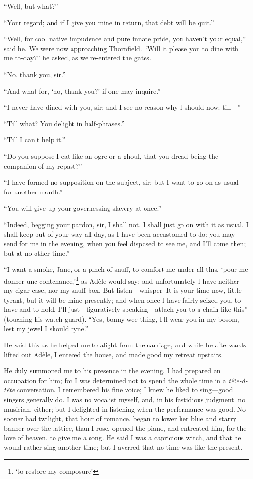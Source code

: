 \enquote{Well, but what?}

\enquote{Your regard; and if I give you mine in return, that debt will
	be quit.}

\enquote{Well, for cool native impudence and pure innate pride, you
	haven't your equal,} said he.  We were now approaching Thornfield.
\enquote{Will it please you to dine with me to-day?} he asked, as we
re-entered the gates.

\enquote{No, thank you, sir.}

\enquote{And what for, \enquote{no, thank you?} if one may inquire.}

\enquote{I never have dined with you, sir: and I see no reason why I
	should now: till---}

\enquote{Till what?  You delight in half-phrases.}

\enquote{Till I can't help it.}

\enquote{Do you suppose I eat like an ogre or a ghoul, that you dread
	being the companion of my repast?}

\enquote{I have formed no supposition on the subject, sir; but I want to
	go on as usual for another month.}

\enquote{You will give up your governessing slavery at once.}

\enquote{Indeed, begging your pardon, sir, I shall not.  I shall just go
	on with it as usual.  I shall keep out of your way all day, as I have
	been accustomed to do: you may send for me in the evening, when you feel
	disposed to see me, and I'll come then; but at no other time.}

\enquote{I want a smoke, Jane, or a pinch of snuff, to comfort me under
	all this, \foreignquote{french}{pour me donner une contenance,}\footnote{
		\enquote{to restore my composure}} as Adèle would say;
	and unfortunately I have neither my cigar-case, nor my snuff-box.  But
	listen---whisper.  It is your time now, little tyrant, but it will be
	mine presently; and when once I have fairly seized you, to have and to
	hold, I'll just---figuratively speaking---attach you to a chain like
	this} (touching his watch-guard).  \enquote{Yes, bonny wee thing, I'll
	wear you in my bosom, lest my jewel I should tyne.}

He said this as he helped me to alight from the carriage, and while he
afterwards lifted out Adèle, I entered the house, and made good my
retreat upstairs.

He duly summoned me to his presence in the evening.  I had prepared an
occupation for him; for I was determined not to spend the whole time in
a \foreignlanguage{french}{\emph{tête-à-tête}} conversation.  I remembered his fine voice; I knew
he liked to sing---good singers generally do.  I was no vocalist myself,
and, in his fastidious judgment, no musician, either; but I delighted in
listening when the performance was good.  No sooner had twilight, that
hour of romance, began to lower her blue and starry banner over the
lattice, than I rose, opened the piano, and entreated him, for the love
of heaven, to give me a song.  He said I was a capricious witch, and
that he would rather sing another time; but I averred that no time was
like the present.

